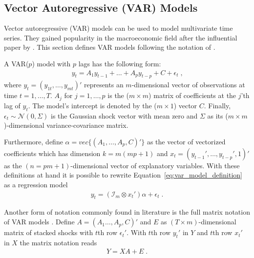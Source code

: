 \subsection{Vector Autoregressive (VAR) Models}
\label{subsec:var_model_defintion}
Vector autoregressive (VAR) models can be used to model multivariate time series. They gained popularity in the macroeconomic field after the influential paper by \textcite{sims_macroeconomics_1980}. This section defines VAR models following the notation of \textcite{hauzenberger_combining_2021}.

A VAR($p$) model with $p$ lags has the following form:
\begin{align}
    \label{eq:var_model_definition}
    y_t = A_1 y_{t - 1} + \dots + A_p y_{t - p} + C + \epsilon_t \; \text{,}
\end{align}
where $y_t = (y_{1t} , \dots , y_{mt})'$ represents an $m$-dimensional vector of observations at time $t = 1 , \dots , T$. $A_j$ for $j = 1 , \dots , p$ is the ($m \times m$) matrix of coefficients at the $j$'th lag of $y_t$. The model's intercept is denoted by the ($m \times 1$) vector $C$. Finally, $\epsilon_t \sim \mathcal{N}(0, \Sigma)$ is the Gaussian shock vector with mean zero and $\Sigma$ as its ($m \times m$)-dimensional variance-covariance matrix.

Furthermore, define $\alpha = vec\{(A_1, \dots , A_p , C)'\}$ as the vector of vectorized coefficients which has dimension $k = m (mp + 1)$ and $x_t = (y_{t - 1}' , \dots , y_{t - p}' , 1)'$ as the $(n = pm + 1)$-dimensional vector of explanatory variables. With these definitions at hand it is possible to rewrite Equation~\eqref{eq:var_model_definition} as a regression model
\begin{align}
    y_t = (\mathcal{I}_m \otimes x_t') \alpha + \epsilon_t \; \text{.}
\end{align}

Another form of notation commonly found in literature is the full matrix notation of VAR models \parencite{koop_bayesian_2009}. Define $A = (A_1 \dots , A_p , C)'$ and $E$ as $(T \times m)$-dimensional matrix of stacked shocks with $t$th row $\epsilon_t'$. With $t$th row $y_t'$ in $Y$ and $t$th row $x_t'$ in $X$ the matrix notation reads
\begin{align}
    Y = XA + E \; \text{.}
\end{align}

